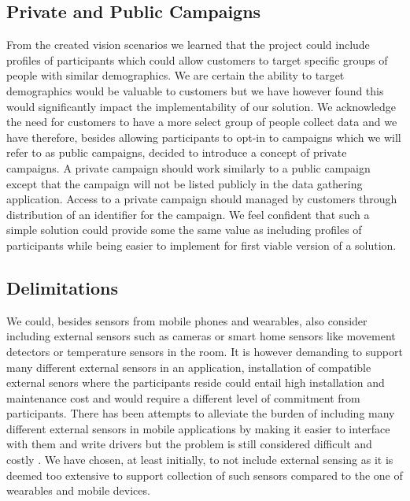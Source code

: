 \subsection{Private and Public Campaigns}
\label{sub:private_and_public_campaigns}

From the created vision scenarios we learned that the project could include profiles of participants which could allow customers to target specific groups of people with similar demographics. We are certain the ability to target demographics would be valuable to customers but we have however found this would significantly impact the implementability of our solution. We acknowledge the need for customers to have a more select group of people collect data and we have therefore, besides allowing participants to opt-in to campaigns which we will refer to as public campaigns, decided to introduce a concept of private campaigns. A private campaign should work similarly to a public campaign except that the campaign will not be listed publicly in the data gathering application. Access to a private campaign should managed by customers through distribution of an identifier for the campaign. We feel confident that such a simple solution could provide some the same value as including profiles of participants while being easier to implement for first viable version of a solution.   

\subsection{Delimitations}
\label{sub:delimitations}
We could, besides sensors from mobile phones and wearables, also consider including external sensors such as cameras or smart home sensors like movement detectors or temperature sensors in the room. It is however demanding to support many different external sensors in an application, installation of compatible external senors where the participants reside could entail high installation and maintenance cost and would require a different level of commitment from participants. There has been attempts to alleviate the burden of including many different external sensors in mobile applications by making it easier to interface with them and write drivers but the problem is still considered difficult and costly \parencite{open_data_kit}. We have chosen, at least initially, to not include external sensing as it is deemed too extensive to support collection of such sensors compared to the one of wearables and mobile devices.
